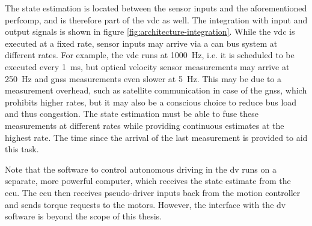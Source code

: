 The state estimation is located between the sensor inputs and the aforementioned \gls{perfcomp}, and is therefore part of the \gls{vdc} as well. The integration with input and output signals is shown in figure \ref{fig:architecture-integration}. While the \gls{vdc} is executed at a fixed rate, sensor inputs may arrive via a \gls{can} bus system at different rates. For example, the \gls{vdc} runs at \SI{1000}{\hertz}, i.e. it is scheduled to be executed every \SI{1}{\milli\second}, but optical velocity sensor measurements may arrive at \SI{250}{\hertz} and \gls{gnss} measurements even slower at \SI{5}{\hertz}. This may be due to a measurement overhead, such as satellite communication in case of the \gls{gnss}, which prohibits higher rates, but it may also be a conscious choice to reduce bus load and thus congestion. The state estimation must be able to fuse these measurements at different rates while providing continuous estimates at the highest rate. The time since the arrival of the last measurement is provided to aid this task.

Note that the software to control autonomous driving in the \gls{dv} runs on a separate, more powerful computer, which receives the state estimate from the \gls{ecu}. The \gls{ecu} then receives pseudo-driver inputs back from the motion controller and sends torque requests to the motors. However, the interface with the \gls{dv} software is beyond the scope of this thesis.
